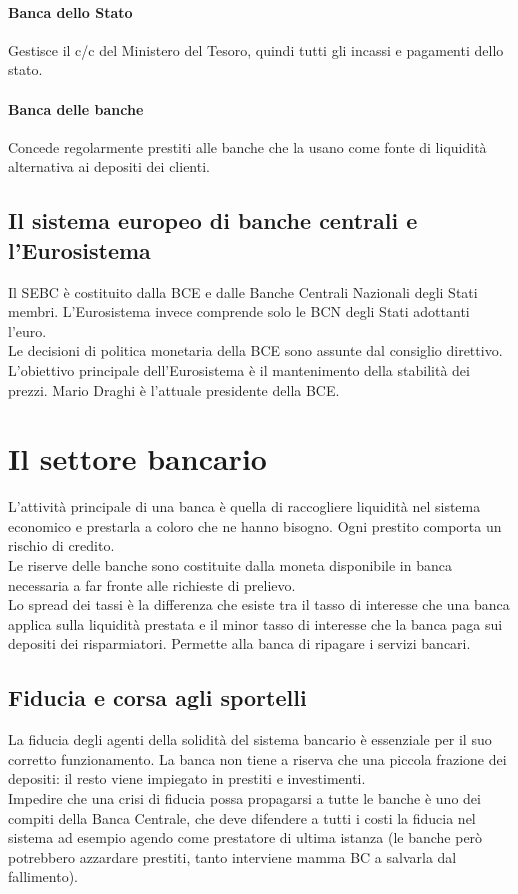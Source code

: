 \documentclass{report}
\begin{document}
	\paragraph{Banca dello Stato} Gestisce il c/c del Ministero del Tesoro, quindi tutti gli incassi e pagamenti dello stato.
	\paragraph{Banca delle banche} Concede regolarmente prestiti alle banche che la usano come fonte di liquidità alternativa ai depositi dei clienti.
	\subsection{Il sistema europeo di banche centrali e l'Eurosistema}
	Il SEBC è costituito dalla BCE e dalle Banche Centrali Nazionali degli Stati membri. L'Eurosistema invece comprende solo le BCN degli Stati adottanti l'euro.
	\medskip \\Le decisioni di politica monetaria della BCE sono assunte dal consiglio direttivo. L'obiettivo principale dell'Eurosistema è il mantenimento della stabilità dei prezzi. Mario Draghi è l'attuale presidente della BCE.
	\section{Il settore bancario}
	L'attività principale di una banca è quella di raccogliere liquidità nel sistema economico e prestarla a coloro che ne hanno bisogno. Ogni prestito comporta un rischio di credito.
	\medskip \\Le riserve delle banche sono costituite dalla moneta disponibile in banca  necessaria a far fronte alle richieste di prelievo.
	\medskip \\Lo spread dei tassi è la differenza che esiste tra il tasso di interesse che una banca applica sulla liquidità prestata e il minor tasso di interesse che la banca paga sui depositi dei risparmiatori. Permette alla banca di ripagare i servizi bancari.
	\subsection{Fiducia e corsa agli sportelli}
	La fiducia degli agenti della solidità del sistema bancario è essenziale per il suo corretto funzionamento. La banca non tiene a riserva che una piccola frazione dei depositi: il resto viene impiegato in prestiti e investimenti.
	\medskip \\Impedire che una crisi di fiducia possa propagarsi a tutte le banche è uno dei compiti della Banca Centrale, che deve difendere a tutti i costi la fiducia nel sistema ad esempio agendo come prestatore di ultima istanza (le banche però potrebbero azzardare prestiti, tanto interviene mamma BC a salvarla dal fallimento).
\end{document}
